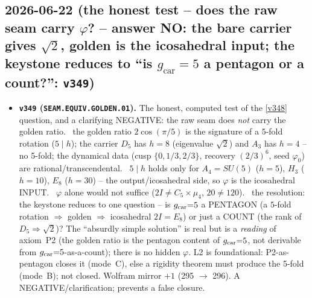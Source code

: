 \subsection*{2026-06-22 (the honest test -- does the raw seam carry $\varphi$? -- answer NO: the bare carrier gives $\sqrt2$, golden is the icosahedral input; the keystone reduces to ``is $g_{\mathrm{car}}{=}5$ a pentagon or a count?'': \texttt{v349})}
\begin{itemize}
\item \textbf{\texttt{v349} (\texttt{SEAM.EQUIV.GOLDEN.01}).} The honest, computed test of the \vref{v348}
question, and a clarifying NEGATIVE: the raw seam does \emph{not} carry the golden ratio. \mE\ the golden ratio
$2\cos(\pi/5)$ is the signature of a $5$-fold rotation ($5\mid h$); the carrier $D_5$ has $h{=}8$ (eigenvalue
$\sqrt2$) and $A_3$ has $h{=}4$ -- no 5-fold; the dynamical data (cusp $\{0,1/3,2/3\}$, recovery $(2/3)^6$, seed
$\varphi_0$) are rational/transcendental. \mE\ $5\mid h$ holds only for $A_4{=}SU(5)$ ($h{=}5$), $H_3$ ($h{=}10$),
$E_8$ ($h{=}30$) -- the output/icosahedral side, so $\varphi$ is the icosahedral INPUT. \mE\ $\varphi$ alone would
not suffice ($2I\neq C_5\times\mu_4$, $20\neq120$). \mO\ the resolution: the keystone reduces to one question --
is $g_{\mathrm{car}}{=}5$ a PENTAGON (a $5$-fold rotation $\Rightarrow$ golden $\Rightarrow$ icosahedral $2I=E_8$) or just a
COUNT (the rank of $D_5\Rightarrow\sqrt2$)? The ``absurdly simple solution'' is real but is a \emph{reading} of
axiom~P2 (the golden ratio is the pentagon content of $g_{\mathrm{car}}{=}5$, not derivable from $g_{\mathrm{car}}{=}5$-as-a-count); there
is no hidden $\varphi$. L2 is foundational: P2-as-pentagon closes it (mode~C), else a rigidity theorem must produce
the 5-fold (mode~B); not closed. Wolfram mirror $+1$ (295 $\to$ 296). A NEGATIVE/clarification; prevents a false
closure.
\end{itemize}

